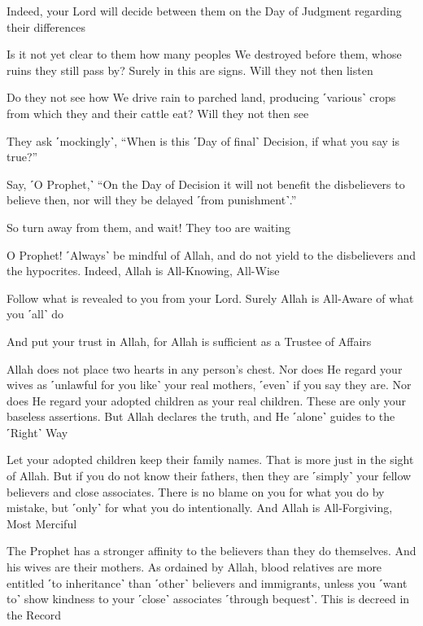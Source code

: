 Indeed, your Lord will decide between them on the Day of Judgment regarding their differences

Is it not yet clear to them how many peoples We destroyed before them, whose ruins they still pass by? Surely in this are signs. Will they not then listen

Do they not see how We drive rain to parched land, producing ˹various˺ crops from which they and their cattle eat? Will they not then see

They ask ˹mockingly˺, “When is this ˹Day of final˺ Decision, if what you say is true?”

Say, ˹O Prophet,˺ “On the Day of Decision it will not benefit the disbelievers to believe then, nor will they be delayed ˹from punishment˺.”

So turn away from them, and wait! They too are waiting

O Prophet! ˹Always˺ be mindful of Allah, and do not yield to the disbelievers and the hypocrites. Indeed, Allah is All-Knowing, All-Wise

Follow what is revealed to you from your Lord. Surely Allah is All-Aware of what you ˹all˺ do

And put your trust in Allah, for Allah is sufficient as a Trustee of Affairs

Allah does not place two hearts in any person’s chest. Nor does He regard your wives as ˹unlawful for you like˺ your real mothers, ˹even˺ if you say they are. Nor does He regard your adopted children as your real children. These are only your baseless assertions. But Allah declares the truth, and He ˹alone˺ guides to the ˹Right˺ Way

Let your adopted children keep their family names. That is more just in the sight of Allah. But if you do not know their fathers, then they are ˹simply˺ your fellow believers and close associates. There is no blame on you for what you do by mistake, but ˹only˺ for what you do intentionally. And Allah is All-Forgiving, Most Merciful

The Prophet has a stronger affinity to the believers than they do themselves. And his wives are their mothers. As ordained by Allah, blood relatives are more entitled ˹to inheritance˺ than ˹other˺ believers and immigrants, unless you ˹want to˺ show kindness to your ˹close˺ associates ˹through bequest˺. This is decreed in the Record

